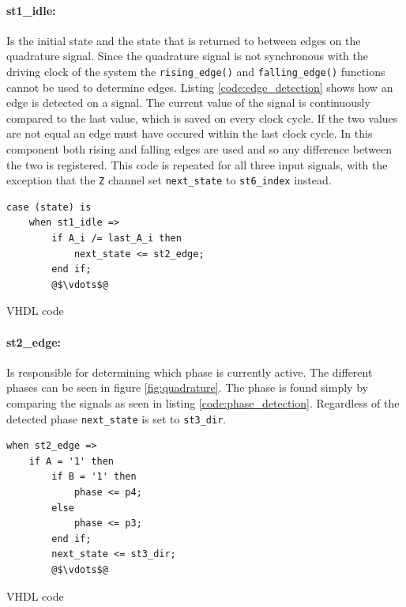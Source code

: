 \paragraph{st1\_idle:} %
Is the initial state and the state that is returned to between edges on the quadrature signal.
Since the quadrature signal is not synchronous with the driving clock of the system the \texttt{rising\_edge()} and \texttt{falling\_edge()} functions cannot be used to determine edges.
Listing \ref{code:edge_detection} shows how an edge is detected on a signal. 
The current value of the signal is continuously compared to the last value, which is saved on every clock cycle.
If the two values are not equal an edge must have occured within the last clock cycle.
In this component both rising and falling edges are used and so any difference between the two is registered.
This code is repeated for all three input signals, with the exception that the \texttt{Z} channel set \texttt{next\_state} to \texttt{st6\_index} instead.

\begin{listing}[h]
\begin{verbatim}
case (state) is
	when st1_idle =>
		if A_i /= last_A_i then
	        next_state <= st2_edge;
	    end if;
	    @$\vdots$@
\end{verbatim}
\caption{VHDL code}
\label{code:edge_detection}
\end{listing}

\paragraph{st2\_edge:} %
Is responsible for determining which phase is currently active.
The different phases can be seen in figure \ref{fig:quadrature}.
The phase is found simply by comparing the signals as seen in listing \ref{code:phase_detection}.
Regardless of the detected phase \texttt{next\_state} is set to \texttt{st3\_dir}.
\begin{listing}[h]
\begin{verbatim}
when st2_edge =>
	if A = '1' then
	    if B = '1' then
	        phase <= p4;
	    else
	        phase <= p3;
	    end if;
	    next_state <= st3_dir;
	    @$\vdots$@
\end{verbatim}
\caption{VHDL code}
\label{code:phase_detection}
\end{listing}
